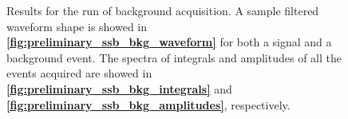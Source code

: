 \documentclass[../../main/main.tex]{subfiles}
\begin{document}
\begin{figure}[h]
    \begin{minipage}[c]{0.33\linewidth}
        \vspace{0pt}
        \centering
    \end{minipage}%
    \hfill%
    \begin{minipage}[c]{0.33\linewidth}
        \vspace{0pt}
        \centering
    \end{minipage}%
    \hfill%
    \begin{minipage}[c]{0.33\linewidth}
        \vspace{0pt}
        \centering
    \end{minipage}%
    \caption{Results for the run of background acquisition. A sample filtered waveform shape is showed in \textbf{\ref{fig:preliminary_ssb_bkg_waveform}} for both a signal and a background event. The spectra of integrals and amplitudes of all the events acquired are showed in \textbf{\ref{fig:preliminary_ssb_bkg_integrals}} and \textbf{\ref{fig:preliminary_ssb_bkg_amplitudes}}, respectively.}
    \label{fig:preliminary_ssb_bkg_run}
\end{figure}
\end{document}
